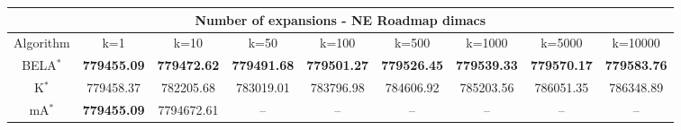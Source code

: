 \begin{tabular}{c|cccccccc}\toprule
\multicolumn{9}{c}{Number of expansions - NE Roadmap dimacs}\\ \midrule
Algorithm & k=1 & k=10 & k=50 & k=100 & k=500 & k=1000 & k=5000 & k=10000 \\ \midrule
BELA$^*$ & \textbf{779455.09} & \textbf{779472.62} & \textbf{779491.68} & \textbf{779501.27} & \textbf{779526.45} & \textbf{779539.33} & \textbf{779570.17} & \textbf{779583.76} \\
K$^*$ & 779458.37 & 782205.68 & 783019.01 & 783796.98 & 784606.92 & 785203.56 & 786051.35 & 786348.89 \\
mA$^*$ & \textbf{779455.09} & 7794672.61 & -- & -- & -- & -- & -- & -- \\ \bottomrule 
\end{tabular}
